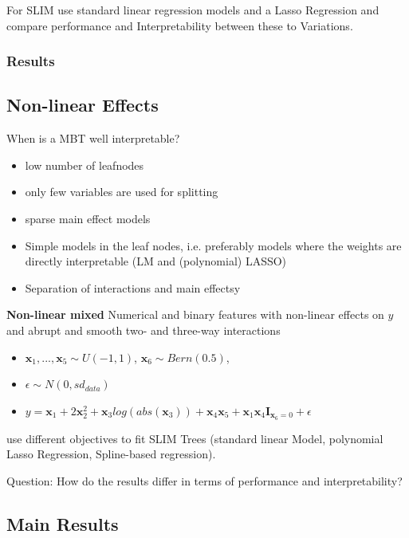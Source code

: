 For SLIM use standard linear regression models and a Lasso Regression and compare performance and Interpretability between these to Variations.

\subsubsection{Results}


\subsection{Non-linear Effects}
When is a MBT well interpretable?
\begin{itemize}
    \item low number of leafnodes
    \item only few variables are used for splitting
    \item sparse main effect models
    \item Simple models in the leaf nodes, i.e. preferably models where the weights are directly interpretable (LM and (polynomial) LASSO)
    \item Separation of interactions and main effectsy
\end{itemize}
\textbf{Non-linear mixed}
Numerical and binary features with non-linear effects on $y$ and abrupt and smooth two- and three-way interactions
\begin{itemize}
    \item $\textbf{x}_1, ..., \textbf{x}_5 \sim U(-1,1)$, $\textbf{x}_6 \sim Bern(0.5)$,  
    \item $\epsilon \sim N(0, sd_{data})$
    \item $y = \textbf{x}_1 + 2 \textbf{x}_2^2 + \textbf{x}_3log(abs(\textbf{x}_3)) + \textbf{x}_4\textbf{x}_5 + \textbf{x}_1\textbf{x}_4\mathbf{I}_{\textbf{x}_6 = 0}+ \epsilon$
\end{itemize}
use different objectives to fit SLIM Trees (standard linear Model, polynomial Lasso Regression, Spline-based regression).

Question: How do the results differ in terms of performance and interpretability?






\subsection{Main Results}
